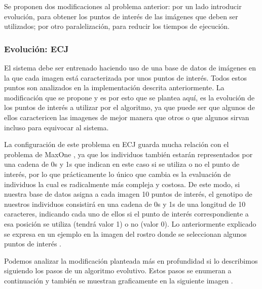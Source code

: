 Se proponen dos modificaciones al problema anterior: por un lado introducir evoluci\'on, para obtener los puntos de inter\'es de las im\'agenes que deben ser utilizados; por otro paralelizaci\'on, para reducir los tiempos de ejecuci\'on.

\subsubsection{Evoluci\'on: ECJ}

El sistema debe ser entrenado haciendo uso de una base de datos de imágenes en la que cada imagen est\'a caracterizada por unos puntos de interés. Todos estos puntos son analizados en la implementación descrita anteriormente. La modificación que se propone y es por esto que se plantea aquí, es la evolución de los puntos de interés a utilizar por el algoritmo, ya que puede ser que algunos de ellos caractericen las imagenes de mejor manera que otros o que algunos sirvan incluso para equivocar al sistema.

La configuraci\'on de este problema en ECJ guarda mucha relación con el problema de MaxOne , ya que los individuos también estar\'an representados por una cadena de 0s y 1s que indican en este caso si se utiliza o no el punto de interés, por lo que prácticamente lo único que cambia es la evaluación de individuos la cual es radicalmente m\'as compleja y costosa. De este modo, si nuestra base de datos asigna a cada imagen 10 puntos de inter\'es, el genotipo de nuestros individuos consistir\'a en una cadena de 0s y 1s de una longitud de 10 caracteres, indicando cada uno de ellos si el punto de inter\'es correspondiente a esa posición se utiliza (tendr\'a valor 1) o no (valor 0). Lo anteriormente explicado se expresa en un ejemplo en la imagen del rostro donde se seleccionan algunos puntos de interés .


Podemos analizar la modificaci\'on planteada m\'as en profundidad si lo describimos siguiendo los pasos de un algoritmo evolutivo. Estos pasos se enumeran a continuaci\'on y tambi\'en se muestran graficamente en la siguiente imagen .


